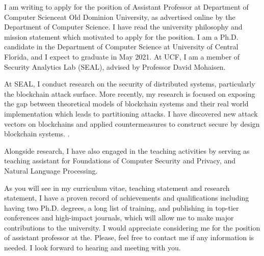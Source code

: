 \documentclass[10pt,stdletter]{newlfm}
\newcommand{\univ}{Old Dominion University}
\newcommand{\depart}{Department of Computer Science}
\begin{document}
\begin{newlfm}

I am writing to apply for the position of Assistant Professor at \depart at \univ, as advertised online by the \depart. I have read the university philosophy and mission statement which motivated to apply for the position. I am a Ph.D. candidate in the Department of Computer Science at University of Central Florida, and I expect to graduate in May 2021. At UCF, I am a member of Security Analytics Lab (SEAL), advised by Professor David Mohaisen. 

At SEAL, I conduct research on the security of distributed systems, particularly the blockchain attack surface. More recently, my research is focused on exposing the gap between theoretical models of blockchain systems and their real world implementation which leads to partitioning attacks. I have discovered new attack vectors on blockchains and applied countermeasures to construct secure by design blockchain systems. . 


Alongside research, I have also engaged in the teaching activities by serving as teaching assistant for Foundations of Computer Security and Privacy, and Natural Language Processing. 




As you will see in my curriculum vitae, teaching statement and research statement, I have a proven record of achievements and qualifications including having two Ph.D. degrees, a long list of training, and publishing in top-tier conferences and high-impact journals, which will allow me to make major contributions to the university. I would appreciate considering me for the position of assistant professor at the. Please, feel free to contact me if any information is needed. I look forward to hearing and meeting with you.

\end{newlfm}
\end{document}
